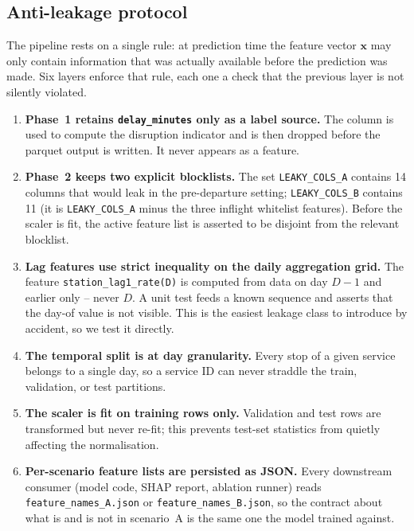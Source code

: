 \begin{description}[leftmargin=2.0em, style=nextline, itemsep=4pt]
\end{description}

\subsection{Anti-leakage protocol}

The pipeline rests on a single rule: at prediction time the feature vector $\mathbf{x}$ may only contain information that was actually available before the prediction was made. Six layers enforce that rule, each one a check that the previous layer is not silently violated.

\begin{enumerate}
    \item \textbf{Phase~1 retains \texttt{delay\_minutes} only as a label source.} The column is used to compute the disruption indicator and is then dropped before the parquet output is written. It never appears as a feature.
    \item \textbf{Phase~2 keeps two explicit blocklists.} The set \texttt{LEAKY\_COLS\_A} contains 14 columns that would leak in the pre-departure setting; \texttt{LEAKY\_COLS\_B} contains 11 (it is \texttt{LEAKY\_COLS\_A} minus the three inflight whitelist features). Before the scaler is fit, the active feature list is asserted to be disjoint from the relevant blocklist.
    \item \textbf{Lag features use strict inequality on the daily aggregation grid.} The feature \texttt{station\_lag1\_rate(D)} is computed from data on day $D-1$ and earlier only -- never $D$. A unit test feeds a known sequence and asserts that the day-of value is not visible. This is the easiest leakage class to introduce by accident, so we test it directly.
    \item \textbf{The temporal split is at day granularity.} Every stop of a given service belongs to a single day, so a service ID can never straddle the train, validation, or test partitions.
    \item \textbf{The scaler is fit on training rows only.} Validation and test rows are transformed but never re-fit; this prevents test-set statistics from quietly affecting the normalisation.
    \item \textbf{Per-scenario feature lists are persisted as JSON.} Every downstream consumer (model code, SHAP report, ablation runner) reads \texttt{feature\_names\_A.json} or \texttt{feature\_names\_B.json}, so the contract about what is and is not in scenario~A is the same one the model trained against.
\end{enumerate}

